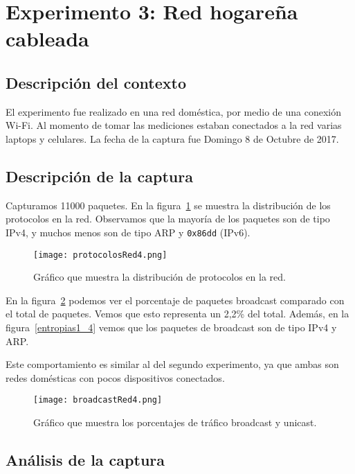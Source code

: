 \section{Experimento 3: Red hogareña cableada}

\subsection{Descripción del contexto}

El experimento fue realizado en una red doméstica, por medio de una conexión Wi-Fi. Al momento de tomar las mediciones estaban conectados a la red varias laptops y celulares. La fecha de la captura fue Domingo 8 de Octubre de 2017.

\subsection{Descripción de la captura}

Capturamos 11000 paquetes. En la figura~\ref{protocolos4} se muestra la distribución de los protocolos en la red. Observamos que la mayoría de los paquetes son de tipo IPv4, y muchos menos son de tipo ARP y \texttt{0x86dd} (IPv6).

\begin{figure}[H]
\centering
\texttt{[image: protocolosRed4.png]}
\caption{Gráfico que muestra la distribución de protocolos en la red.}
\label{protocolos4}
\end{figure}

En la figura~\ref{broadcast4} podemos ver el porcentaje de paquetes broadcast comparado con el total de paquetes. Vemos que esto representa un 2,2\% del total. Además, en la figura~\ref{entropias1_4} vemos que los paquetes de broadcast son de tipo IPv4 y ARP.

Este comportamiento es similar al del segundo experimento, ya que ambas son redes domésticas con pocos dispositivos conectados.

\begin{figure}[H]
\centering
\texttt{[image: broadcastRed4.png]}
\caption{Gráfico que muestra los porcentajes de tráfico broadcast y unicast.}
\label{broadcast4}
\end{figure}

\subsection{Análisis de la captura}

